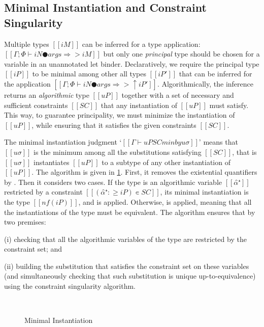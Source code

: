 \subsection{Minimal Instantiation and Constraint Singularity}
\label{sec:constraint-singularity}

Multiple types $[[iM]]$ can be inferred for a type application:
$[[Γ ; Φ ⊢ iN ● args ⇒> iM]]$ but only one \emph{principal} 
type should be chosen for a variable in an unannotated let binder.
Declaratively, we require the principal type $[[iP]]$ to be
minimal among other all types $[[iP']]$ that can be inferred
for the application $[[Γ ; Φ ⊢ iN ● args ⇒> ↑iP']]$.
Algorithmically, the inference returns an
\emph{algorithmic} type $[[uP]]$ 
together with a set of necessary and sufficient constraints $[[SC]]$
that any instantiation of $[[uP]]$ must satisfy.
This way, to guarantee principality, we must minimize the instantiation of $[[uP]]$,
while ensuring that it satisfies the given constraints $[[SC]]$. 

The minimal instantiation judgment `$[[Γ ⊢ uP SC minby uσ]]$'
means that $[[uσ]]$ is the minimum among all the substitutions satisfying $[[SC]]$,
that is $[[uσ]]$ instantiates $[[uP]]$ to a subtype of any other 
instantiation of $[[uP]]$. The algorithm is given in \cref{fig:minimal-instantiation}.
First, it removes the existential quantifiers by .
Then it considers two cases. If the type is an algorithmic variable $[[α̂⁺]]$
restricted by a constraint $[[(α̂⁺ :≥ iP) ∊ SC]]$,
its minimal instantiation is the type $[[nf(iP)]]$, 
and  is applied.
Otherwise,  is applied,
meaning that all the instantiations of the type must be equivalent.
The algorithm ensures that by two premises:
\begin{enumerate*}
  \item[(i)] checking that all the algorithmic variables of the type are restricted by the constraint set; and
  \item[(ii)] building the substitution that satisfies the constraint set on these variables 
    (and simultaneously checking that such substitution is unique up-to-equivalence)
    using the constraint singularity algorithm.
\end{enumerate*}

\begin{figure}[h]
  \hfill\\
  \ottdefnMININSTLabeled
  \caption{Minimal Instantiation}
  \label{fig:minimal-instantiation}
\end{figure}


